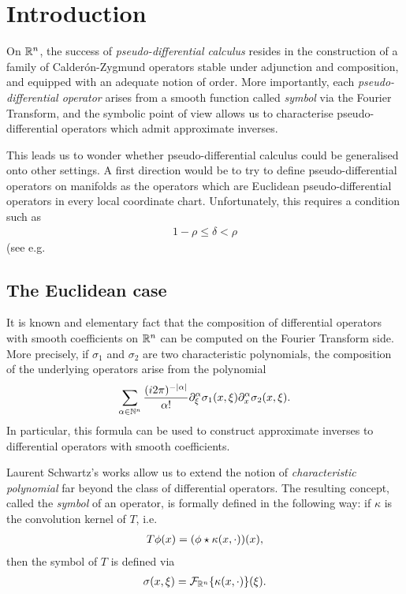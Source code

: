 \chapter{Introduction}

On $\R^n$,
the success of \emph{pseudo-differential calculus} resides in the construction of a family of Calder\'on-Zygmund operators stable under adjunction and composition,
and equipped with an adequate notion of order.
More importantly,
each \emph{pseudo-differential operator} arises from a smooth function called \emph{symbol} via the Fourier Transform,
and the symbolic point of view allows us to characterise pseudo-differential operators which admit approximate inverses.

This leads us to wonder whether pseudo-differential calculus could be generalised onto other settings.
A first direction would be to try to define pseudo-differential operators on manifolds as the operators which are Euclidean pseudo-differential operators in every local coordinate chart.
Unfortunately,
this requires a condition such as
\begin{align*}
    1 - \rho \leq \delta < \rho
\end{align*}
(see e.g.\ \cite[Section 4]{Shubin}

\section{The Euclidean case}

It is known and elementary fact that
the composition of differential operators with smooth coefficients on $\R^n$ can be computed on the Fourier Transform side.
More precisely,
if $\sigma_1$ and $\sigma_2$ are two characteristic polynomials,
the composition of the underlying operators arise from the polynomial
\begin{align}
    \sum_{\alpha \in \N^n} \frac {(\i \turn)^{-\abs \alpha}} {\alpha!} \iD{\xi^\alpha} \sigma_1(x, \xi) \iD{x^\alpha} \sigma_2(x, \xi)
    \label{eq:composition_formula_for_characteristic_polynomials}.
\end{align}
In particular,
this formula can be used to construct approximate inverses to differential operators with smooth coefficients.

Laurent Schwartz's works allow us to extend the notion of \emph{characteristic polynomial} far beyond the class of differential operators.
The resulting concept,
called the \emph{symbol} of an operator,
is formally defined in the following way:
if $\kappa$ is the convolution kernel of $T$, i.e.\
\begin{align*}
    T \phi(x) = (\conv \phi {\kappa(x, \dummy)})(x),
\end{align*}
then the symbol of $T$ is defined via
\begin{align*}
    \sigma(x, \xi) = \Fourier [\R^n] \{\kappa(x, \dummy)\}(\xi).
\end{align*}

